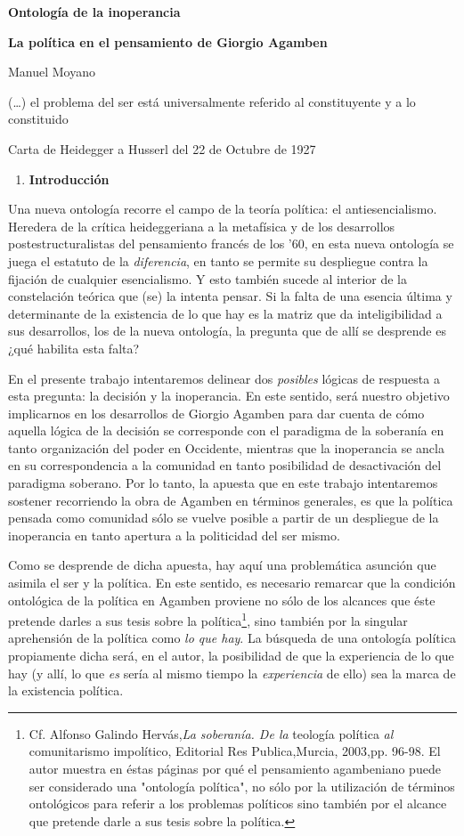 \documentclass{book}
\begin{document}
\textbf{Ontología de la inoperancia}

\textbf{La política en el pensamiento de Giorgio Agamben}

Manuel Moyano

(\dots) el problema del ser está universalmente referido al
constituyente y a lo constituido

Carta de Heidegger a Husserl del 22 de Octubre de 1927

\begin{enumerate}
\def\labelenumi{\arabic{enumi}.}
\item
  \textbf{Introducción}
\end{enumerate}

Una nueva ontología recorre el campo de la teoría política: el
antiesencialismo. Heredera de la crítica heideggeriana a la metafísica y
de los desarrollos postestructuralistas del pensamiento francés de los
'60, en esta nueva ontología se juega el estatuto de la
\emph{diferencia}, en tanto se permite su despliegue contra la fijación
de cualquier esencialismo. Y esto también sucede al interior de la
constelación teórica que (se) la intenta pensar. Si la falta de una
esencia última y determinante de la existencia de lo que hay es la
matriz que da inteligibilidad a sus desarrollos, los de la nueva
ontología, la pregunta que de allí se desprende es ¿qué habilita esta
falta?

En el presente trabajo intentaremos delinear dos \emph{posibles} lógicas
de respuesta a esta pregunta: la decisión y la inoperancia. En este
sentido, será nuestro objetivo implicarnos en los desarrollos de Giorgio
Agamben para dar cuenta de cómo aquella lógica de la decisión se
corresponde con el paradigma de la soberanía en tanto organización del
poder en Occidente, mientras que la inoperancia se ancla en su
correspondencia a la comunidad en tanto posibilidad de desactivación del
paradigma soberano. Por lo tanto, la apuesta que en este trabajo
intentaremos sostener recorriendo la obra de Agamben en términos
generales, es que la política pensada como comunidad sólo se vuelve
posible a partir de un despliegue de la inoperancia en tanto apertura a
la politicidad del ser mismo.

Como se desprende de dicha apuesta, hay aquí una problemática asunción
que asimila el ser y la política. En este sentido, es necesario remarcar
que la condición ontológica de la política en Agamben proviene no sólo
de los alcances que éste pretende darles a sus tesis sobre la
política\footnote{Cf. Alfonso Galindo Hervás,\emph{La soberanía. De la}
  teología política \emph{al} comunitarismo impolítico, Editorial Res
  Publica,Murcia, 2003,pp. 96-98. El autor muestra en éstas páginas por
  qué el pensamiento agambeniano puede ser considerado una "ontología
  política", no sólo por la utilización de términos ontológicos para
  referir a los problemas políticos sino también por el alcance que
  pretende darle a sus tesis sobre la política.}, sino también por la
singular aprehensión de la política como \emph{lo que hay}. La búsqueda
de una ontología política propiamente dicha será, en el autor, la
posibilidad de que la experiencia de lo que hay (y allí, lo que
\emph{es} sería al mismo tiempo la \emph{experiencia} de ello) sea la
marca de la existencia política.
\end{document}
